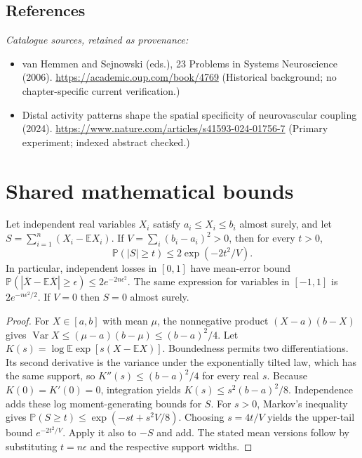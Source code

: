 \documentclass[11pt]{article}
\begin{document}
\subsection{References}
\noindent\emph{Catalogue sources, retained as provenance:}
\begin{itemize}
\item van Hemmen and Sejnowski (eds.), 23 Problems in Systems Neuroscience (2006). \url{https://academic.oup.com/book/4769} (Historical background; no chapter-specific current verification.)
\item Distal activity patterns shape the spatial specificity of neurovascular coupling (2024). \url{https://www.nature.com/articles/s41593-024-01756-7} (Primary experiment; indexed abstract checked.)
\end{itemize}




\section{Shared mathematical bounds}\label{app:bounds}
\begin{lemma}\label{lem:bounded}
Let independent real variables $X_i$ satisfy $a_i\leq X_i\leq b_i$ almost surely,
and let $S=\sum_{i=1}^n(X_i-\mathbb{E} X_i)$. If
$V=\sum_i(b_i-a_i)^2>0$, then for every $t>0$,
\[
 \mathbb{P}(|S|\geq t)\leq 2\exp(-2t^2/V).
\]
In particular, independent losses in $[0,1]$ have mean-error bound
$\mathbb{P}(|\overline X-\mathbb{E}\overline X|\geq\epsilon)
\leq2e^{-2n\epsilon^2}$. The same expression for variables in $[-1,1]$
is $2e^{-n\epsilon^2/2}$. If $V=0$ then $S=0$ almost surely.
\end{lemma}
\begin{proof}
For $X\in[a,b]$ with mean $\mu$, the nonnegative product
$(X-a)(b-X)$ gives
$\operatorname{Var} X\leq(\mu-a)(b-\mu)\leq(b-a)^2/4$.
Let $K(s)=\log\mathbb{E}\exp[s(X-\mathbb{E} X)]$.
Boundedness permits two differentiations. Its second derivative is the variance
under the exponentially tilted law, which has the same support, so
$K''(s)\leq(b-a)^2/4$ for every real $s$.
Because $K(0)=K'(0)=0$, integration yields
$K(s)\leq s^2(b-a)^2/8$.
Independence adds these log moment-generating bounds for $S$.
For $s>0$, Markov's inequality gives
$\mathbb{P}(S\geq t)\leq\exp(-st+s^2V/8)$.
Choosing $s=4t/V$ yields the upper-tail bound $e^{-2t^2/V}$.
Apply it also to $-S$ and add. The stated mean versions follow by substituting
$t=n\epsilon$ and the respective support widths.
\end{proof}
\end{document}
